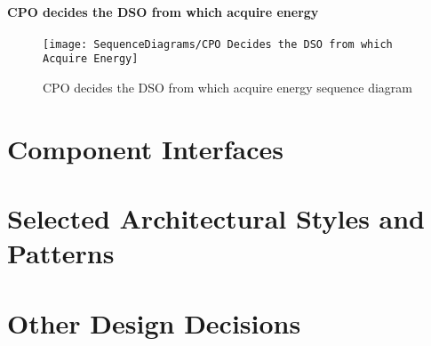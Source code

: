 \paragraph{CPO decides the DSO from which acquire energy}
\begin{figure}[H]
    \begin{center}
        \texttt{[image: SequenceDiagrams/CPO Decides the DSO from which Acquire Energy]}
        \caption{CPO decides the DSO from which acquire energy sequence diagram}
        \label{cpo_decides_dso_from_which_acquire_energy}
    \end{center}
\end{figure}


\section{Component Interfaces}
\label{sec: component_interfaces}%


\section{Selected Architectural Styles and Patterns}
\label{sec: patterns}%


\section{Other Design Decisions}
\label{sec: other_design_decisions}%
